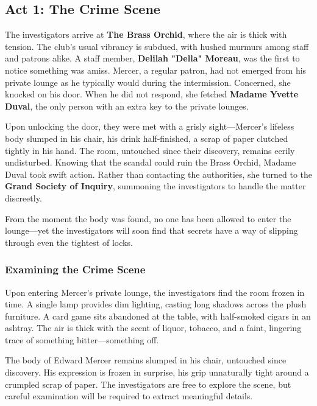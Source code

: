 \subsection{Act 1: The Crime Scene}


The investigators arrive at \textbf{The Brass Orchid}, where the air is thick with tension. The club’s usual vibrancy is subdued, with hushed murmurs among staff and patrons alike. A staff member, \textbf{Delilah "Della" Moreau}, was the first to notice something was amiss. Mercer, a regular patron, had not emerged from his private lounge as he typically would during the intermission. Concerned, she knocked on his door. When he did not respond, she fetched \textbf{Madame Yvette Duval}, the only person with an extra key to the private lounges. 

Upon unlocking the door, they were met with a grisly sight—Mercer’s lifeless body slumped in his chair, his drink half-finished, a scrap of paper clutched tightly in his hand. The room, untouched since their discovery, remains eerily undisturbed. Knowing that the scandal could ruin the Brass Orchid, Madame Duval took swift action. Rather than contacting the authorities, she turned to the \textbf{Grand Society of Inquiry}, summoning the investigators to handle the matter discreetly.

From the moment the body was found, no one has been allowed to enter the lounge—yet the investigators will soon find that secrets have a way of slipping through even the tightest of locks.


\subsubsection{Examining the Crime Scene}


Upon entering Mercer's private lounge, the investigators find the room frozen in time. A single lamp provides dim lighting, casting long shadows across the plush furniture. A card game sits abandoned at the table, with half-smoked cigars in an ashtray. The air is thick with the scent of liquor, tobacco, and a faint, lingering trace of something bitter—something off.

The body of Edward Mercer remains slumped in his chair, untouched since discovery. His expression is frozen in surprise, his grip unnaturally tight around a crumpled scrap of paper. The investigators are free to explore the scene, but careful examination will be required to extract meaningful details.

